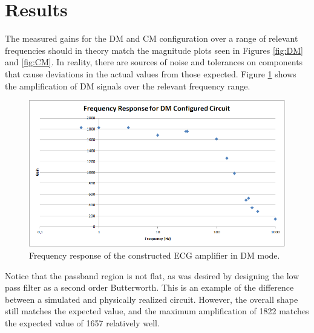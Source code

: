 \documentclass[pdftex,12pt,letterpaper]{article}
\begin{document}
\section{Results}

The measured gains for the DM and CM configuration over a range of relevant frequencies should in theory match the magnitude plots seen in Figures \ref{fig:DM} and \ref{fig:CM}. In reality, there are sources of noise and tolerances on components that cause deviations in the actual values from those expected. Figure \ref{fig:DM_response} shows the amplification of DM signals over the relevant frequency range.
\begin{figure}[H]
\begin{center}
\includegraphics[scale=.5]{fig1.png}
\caption{Frequency response of the constructed ECG amplifier in DM mode.}
\label{fig:DM_response}
\end{center}
\end{figure}
Notice that the passband region is not flat, as was desired by designing the low pass filter as a second order Butterworth. This is an example of the difference between a simulated and physically realized circuit. However, the overall shape still matches the expected value, and the maximum amplification of 1822 matches the expected value of 1657 relatively well. 
\end{document}

